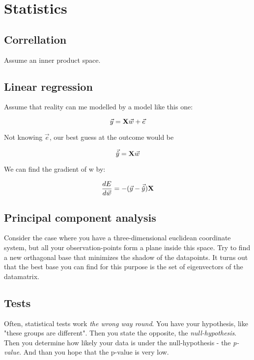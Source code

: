 \section{Statistics}

\subsection{Correllation}
Assume an inner product space.

\subsection{Linear regression}

Assume that reality can me modelled by a model like this one: 

$$ \vec{y} = \mathbf{X} \vec{w} + \vec{e} $$

Not knowing $\vec{e}$, our best guess at the outcome would be 

$$ \vec{\hat{y}} = \mathbf{X} \vec{w} $$

We can find the gradient of w by:

$$  \frac{ \mathop{dE} }{ \mathop{d\vec{w}} }  = -  (\vec{y} - \vec{\hat{y}}) \mathbf{X}  $$



\subsection{Principal component analysis}
Consider the case where you have a three-dimensional euclidean coordinate system, but all your observation-points form a plane inside this space. Try to find a new orthagonal base that minimizes the shadow of the datapoints.
It turns out that the best base you can find for this purpose is the set of eigenvectors of the datamatrix. 



\subsection{Tests}
Often, statistical tests work \emph{the wrong way round}. You have your hypothesis, like "these groups are different". Then you state the opposite, the \emph{null-hypothesis}. Then you determine how likely your data is under the null-hypothesis - the \emph{p-value}. And than you hope that the p-value is very low.

